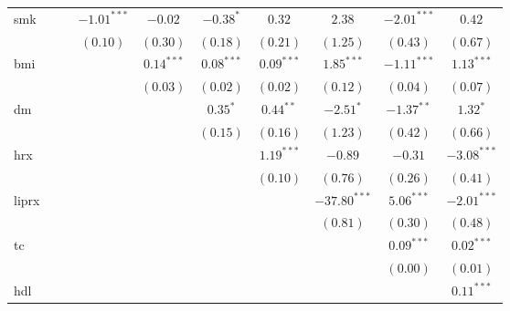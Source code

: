 \begin{tabular}{l c c c c c c c c c}
smk                 &              &              & $-1.01^{***}$ & $-0.02$        & $-0.38^{*}$    & $0.32$         & $2.38$         & $-2.01^{***}$ & $0.42$        \\
                    &              &              & $(0.10)$      & $(0.30)$       & $(0.18)$       & $(0.21)$       & $(1.25)$       & $(0.43)$      & $(0.67)$      \\
bmi                 &              &              &               & $0.14^{***}$   & $0.08^{***}$   & $0.09^{***}$   & $1.85^{***}$   & $-1.11^{***}$ & $1.13^{***}$  \\
                    &              &              &               & $(0.03)$       & $(0.02)$       & $(0.02)$       & $(0.12)$       & $(0.04)$      & $(0.07)$      \\
dm                  &              &              &               &                & $0.35^{*}$     & $0.44^{**}$    & $-2.51^{*}$    & $-1.37^{**}$  & $1.32^{*}$    \\
                    &              &              &               &                & $(0.15)$       & $(0.16)$       & $(1.23)$       & $(0.42)$      & $(0.66)$      \\
hrx                 &              &              &               &                &                & $1.19^{***}$   & $-0.89$        & $-0.31$       & $-3.08^{***}$ \\
                    &              &              &               &                &                & $(0.10)$       & $(0.76)$       & $(0.26)$      & $(0.41)$      \\
liprx               &              &              &               &                &                &                & $-37.80^{***}$ & $5.06^{***}$  & $-2.01^{***}$ \\
                    &              &              &               &                &                &                & $(0.81)$       & $(0.30)$      & $(0.48)$      \\
tc                  &              &              &               &                &                &                &                & $0.09^{***}$  & $0.02^{***}$  \\
                    &              &              &               &                &                &                &                & $(0.00)$      & $(0.01)$      \\
hdl                 &              &              &               &                &                &                &                &               & $0.11^{***}$  \\

\end{tabular}
